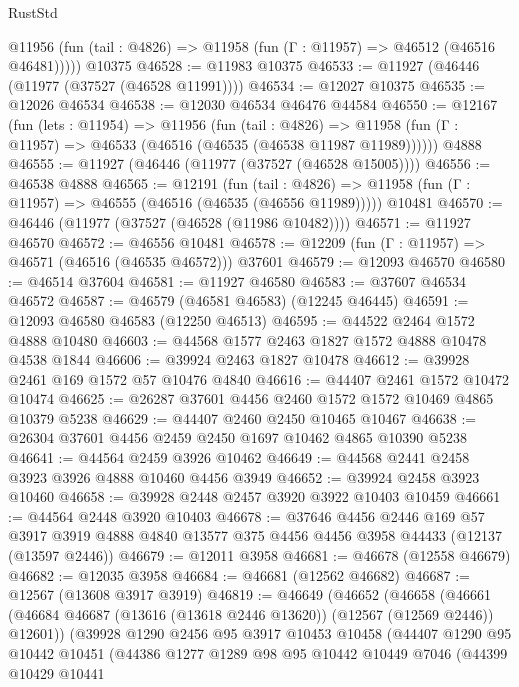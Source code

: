 \begin{lexlean}{RustStd}
\begin{coremodule}
      @11956 (fun (tail : @4826) => @11958 (fun (Γ : @11957) => @46512 (@46516 @46481)))))
    @10375
@46528 := @11983 @10375
@46533 := @11927 (@46446 (@11977 (@37527 (@46528 @11991))))
@46534 := @12027 @10375
@46535 := @12026 @46534
@46538 := @12030 @46534 @46476 @44584
@46550 := @12167
    (fun (lets : @11954) =>
    @11956
      (fun (tail : @4826) =>
      @11958 (fun (Γ : @11957) => @46533 (@46516 (@46535 (@46538 @11987 @11989))))))
    @4888
@46555 := @11927 (@46446 (@11977 (@37527 (@46528 @15005))))
@46556 := @46538 @4888
@46565 := @12191
    (fun (tail : @4826) => @11958 (fun (Γ : @11957) => @46555 (@46516 (@46535 (@46556 @11989)))))
    @10481
@46570 := @46446 (@11977 (@37527 (@46528 (@11986 @10482))))
@46571 := @11927 @46570
@46572 := @46556 @10481
@46578 := @12209 (fun (Γ : @11957) => @46571 (@46516 (@46535 @46572))) @37601
@46579 := @12093 @46570
@46580 := @46514 @37604
@46581 := @11927 @46580
@46583 := @37607 @46534 @46572
@46587 := @46579 (@46581 @46583) (@12245 @46445)
@46591 := @12093 @46580 @46583 (@12250 @46513)
@46595 := @44522 @2464 @1572 @4888 @10480
@46603 := @44568 @1577 @2463 @1827 @1572 @4888 @10478 @4538 @1844
@46606 := @39924 @2463 @1827 @10478
@46612 := @39928 @2461 @169 @1572 @57 @10476 @4840
@46616 := @44407 @2461 @1572 @10472 @10474
@46625 := @26287 @37601 @4456 @2460 @1572 @1572 @10469 @4865 @10379 @5238
@46629 := @44407 @2460 @2450 @10465 @10467
@46638 := @26304 @37601 @4456 @2459 @2450 @1697 @10462 @4865 @10390 @5238
@46641 := @44564 @2459 @3926 @10462
@46649 := @44568 @2441 @2458 @3923 @3926 @4888 @10460 @4456 @3949
@46652 := @39924 @2458 @3923 @10460
@46658 := @39928 @2448 @2457 @3920 @3922 @10403 @10459
@46661 := @44564 @2448 @3920 @10403
@46678 := @37646
    @4456
    @2446
    @169
    @57
    @3917
    @3919
    @4888
    @4840
    @13577
    @375
    @4456
    @4456
    @3958
    @44433
    (@12137 (@13597 @2446))
@46679 := @12011 @3958
@46681 := @46678 (@12558 @46679)
@46682 := @12035 @3958
@46684 := @46681 (@12562 @46682)
@46687 := @12567 (@13608 @3917 @3919)
@46819 := @46649
    (@46652
      (@46658
        (@46661 (@46684 @46687 (@13616 (@13618 @2446 @13620)) (@12567 (@12569 @2446)) @12601))
        (@39928
          @1290
          @2456
          @95
          @3917
          @10453
          @10458
          (@44407
            @1290
            @95
            @10442
            @10451
            (@44386
              @1277
              @1289
              @98
              @95
              @10442
              @10449
              @7046
              (@44399
                @10429
                @10441

\end{coremodule}
\end{lexlean}
